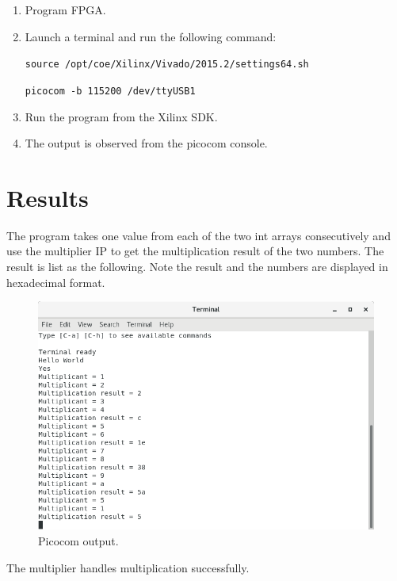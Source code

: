 \documentclass[11pt,letterpaper,titlepage]{article}
\begin{document}
\begin{enumerate}
    \item Program FPGA.
    
    \item Launch a terminal and run the following command:
    
    \verb|source /opt/coe/Xilinx/Vivado/2015.2/settings64.sh|
    
    \verb|picocom -b 115200 /dev/ttyUSB1|
    
    \item Run the program from the Xilinx SDK.
    
    \item The output is observed from the picocom console.
    
\end{enumerate}

\newpage

\part{Results}

The program takes one value from each of the two int arrays consecutively and use the multiplier IP to get the multiplication result of the two numbers. The result is list as the following. Note the result and the numbers are displayed in hexadecimal format.

\begin{figure}[ht]
    \centering
    \includegraphics[width=\textwidth]{picocom.png}
    \caption{Picocom output.}
    \end{figure}

The multiplier handles multiplication successfully.

\newpage
\end{document}
